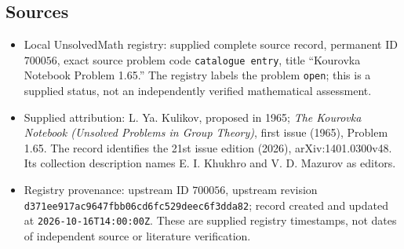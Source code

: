 \documentclass[11pt]{article}
\begin{document}
\subsection{Sources}
\begin{itemize}
\item Local UnsolvedMath registry: supplied complete source record, permanent ID $700056$, exact source problem code \texttt{catalogue entry}, title ``Kourovka Notebook Problem 1.65.'' The registry labels the problem \texttt{open}; this is a supplied status, not an independently verified mathematical assessment.
\item Supplied attribution: L. Ya. Kulikov, proposed in 1965; \emph{The Kourovka Notebook (Unsolved Problems in Group Theory)}, first issue (1965), Problem 1.65. The record identifies the 21st issue edition (2026), arXiv:1401.0300v48. Its collection description names E. I. Khukhro and V. D. Mazurov as editors.
\item Registry provenance: upstream ID $700056$, upstream revision \texttt{d371ee917ac9647fbb06cd6fc529deec6f3dda82}; record created and updated at \texttt{2026-10-16T14:00:00Z}. These are supplied registry timestamps, not dates of independent source or literature verification.
\end{itemize}
\end{document}
